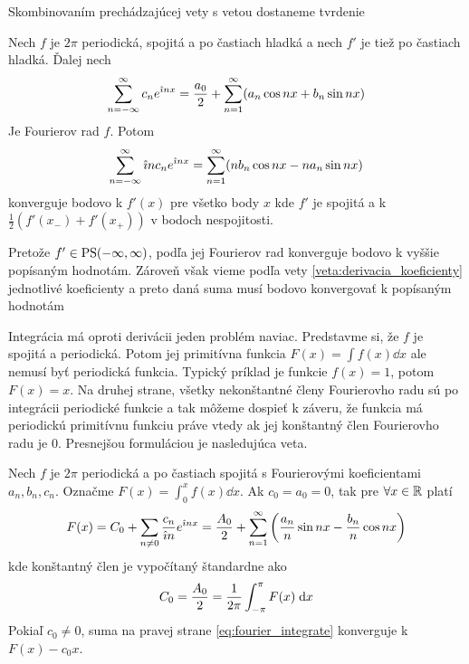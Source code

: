 Skombinovaním prechádzajúcej vety s vetou 
dostaneme tvrdenie
\begin{veta}
    Nech $f$ je $2\pi$ periodická, spojitá a po častiach hladká a nech
    $f'$ je tiež po častiach hladká. Ďalej nech    
    \begin{equation}
        \sum_{n=-\infty}^{\infty} c_n e^{\hat{\imath} n x} = 
         \frac{a_0}{2} + \sum_{n=1}^{\infty} (
            a_n \cos n x + b_n \sin n x)        
    \end{equation}
    Je Fourierov rad $f$.
    Potom
    \begin{equation}
        \sum_{n=-\infty}^{\infty} \hat{\imath} n c_n e^{\hat{\imath} n x} = 
         \sum_{n=1}^{\infty} (
            n b_n \cos n x - n a_n \sin n x)        
    \end{equation}
    konverguje bodovo k $f'(x)$ pre všetko body $x$ kde $f'$ je
    spojitá a k $\frac{1}{2}(f'(x_-) + f'(x_+) )$ v bodoch
    nespojitosti.
    \label{veta:fourier_derivacia}
\end{veta}

\begin{dokaz}
  Pretože $f'\in \mbox{PS}(-\infty,\infty)$, podľa  jej Fourierov rad
  konverguje bodovo k vyššie popísaným hodnotám. Zároveň však vieme
  podľa vety \ref{veta:derivacia_koeficienty} jednotlivé koeficienty
  a preto daná suma musí bodovo konvergovať k popísaným hodnotám
\end{dokaz}

Integrácia má oproti derivácii jeden problém naviac.
Predstavme si, že $f$ je spojitá a periodická. Potom jej primitívna
funkcia
$F(x) = \int f(x) \dd x$ ale nemusí byť periodická funkcia.
Typický príklad je funkcie $f(x)=1$, potom $F(x)=x$. Na druhej strane,
 všetky nekonštantné členy Fourierovho radu sú po integrácii
 periodické funkcie a tak môžeme dospieť k záveru, že funkcia má
 periodickú primitívnu funkciu práve vtedy ak jej konštantný člen
 Fourierovho radu je 0. Presnejšou formuláciou je nasledujúca veta.

\begin{veta}
    Nech $f$ je $2\pi$ periodická a po častiach spojitá s Fourierovými
    koeficientami $a_n,b_n,c_n$. Označme
    $F(x) = \int_{0}^{x} f(x) \dd x$. Ak $c_0 = a_0 =0$, tak 
    pre $\forall x\in {\mathbb R}$ platí
    \begin{equation}
        F(x) = C_0 + \sum_{n\not=0} \frac{c_n}{\hat{\imath} n} e^{\hat{\imath} n x}
        = \frac{A_0}{2} + \sum_{n=1}^{\infty} \left(
                \frac{a_n}{n} \sin nx - \frac{b_n}{n} \cos nx\right)
    \label{eq:fourier_integrate}
    \end{equation}
    kde konštantný člen je vypočítaný štandardne ako 
    \begin{equation}
        C_0 = \frac{A_0}{2} = \frac{1}{2\pi} \int_{-\pi}^{\pi} F(x) \; \mathrm{d} x
    \end{equation}
    Pokiaľ $c_0\not=0$, suma na pravej strane
    \ref{eq:fourier_integrate} konverguje k $F(x) - c_0 x$.
\end{veta}

